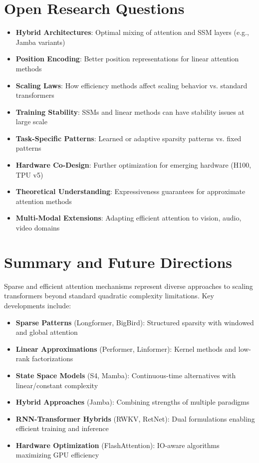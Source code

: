 \documentclass[11pt]{article}
\begin{document}
\section{Open Research Questions}

\begin{itemize}[leftmargin=*]
    \item \textbf{Hybrid Architectures}: Optimal mixing of attention and SSM layers (e.g., Jamba variants)
    \item \textbf{Position Encoding}: Better position representations for linear attention methods
    \item \textbf{Scaling Laws}: How efficiency methods affect scaling behavior vs. standard transformers
    \item \textbf{Training Stability}: SSMs and linear methods can have stability issues at large scale
    \item \textbf{Task-Specific Patterns}: Learned or adaptive sparsity patterns vs. fixed patterns
    \item \textbf{Hardware Co-Design}: Further optimization for emerging hardware (H100, TPU v5)
    \item \textbf{Theoretical Understanding}: Expressiveness guarantees for approximate attention methods
    \item \textbf{Multi-Modal Extensions}: Adapting efficient attention to vision, audio, video domains
\end{itemize}

\section{Summary and Future Directions}

Sparse and efficient attention mechanisms represent diverse approaches to scaling transformers beyond standard quadratic complexity limitations. Key developments include:

\begin{itemize}[leftmargin=*]
    \item \textbf{Sparse Patterns} (Longformer, BigBird): Structured sparsity with windowed and global attention
    \item \textbf{Linear Approximations} (Performer, Linformer): Kernel methods and low-rank factorizations
    \item \textbf{State Space Models} (S4, Mamba): Continuous-time alternatives with linear/constant complexity
    \item \textbf{Hybrid Approaches} (Jamba): Combining strengths of multiple paradigms
    \item \textbf{RNN-Transformer Hybrids} (RWKV, RetNet): Dual formulations enabling efficient training and inference
    \item \textbf{Hardware Optimization} (FlashAttention): IO-aware algorithms maximizing GPU efficiency
\end{itemize}
\end{document}
